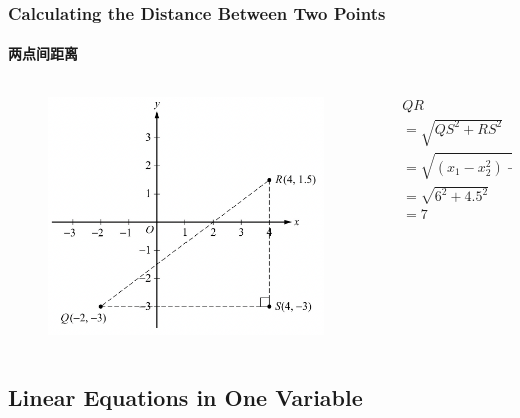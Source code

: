 \documentclass[
	11pt, %
]{beamer}
\begin{document}
\begin{frame}
	\frametitle{Calculating the Distance Between Two Points}
	\framesubtitle{两点间距离}
	\begin{columns}[t] 
		\begin{column}{0.6\textwidth} %
			\begin{figure}
		    \includegraphics[width=\linewidth]{Distance_Between _Two_Points.png}
		 \end{figure}
		\end{column}
		\begin{column}{0.4 \textwidth} %
			\begin{equation*}
				\begin{aligned}
				&QR\\
				&= \sqrt{QS^2 + RS^2}\\
				&= \sqrt{(x_1 - x_2^2) + (y_1 + y_2)^2}\\
				&= \sqrt{6^2 + 4.5^2}\\
				&= 7\\
				\end{aligned}
			\end{equation*}

    \end{column}
	\end{columns}
\end{frame}



\subsection{Linear Equations in One Variable}
\end{document}
